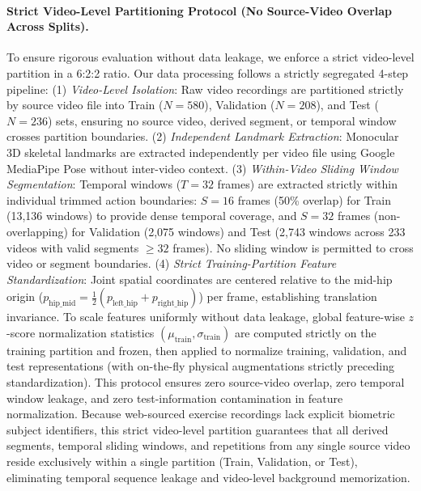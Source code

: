 \documentclass[preprint,12pt]{elsarticle}
\begin{document}
\paragraph{Strict Video-Level Partitioning Protocol (No Source-Video Overlap Across Splits).} To ensure rigorous evaluation without data leakage, we enforce a strict video-level partition in a 6:2:2 ratio. Our data processing follows a strictly segregated 4-step pipeline: (1) \textit{Video-Level Isolation}: Raw video recordings are partitioned strictly by source video file into Train ($N=580$), Validation ($N=208$), and Test ($N=236$) sets, ensuring no source video, derived segment, or temporal window crosses partition boundaries. (2) \textit{Independent Landmark Extraction}: Monocular 3D skeletal landmarks are extracted independently per video file using Google MediaPipe Pose without inter-video context. (3) \textit{Within-Video Sliding Window Segmentation}: Temporal windows ($T = 32$ frames) are extracted strictly within individual trimmed action boundaries: $S = 16$ frames (50\% overlap) for Train (13,136 windows) to provide dense temporal coverage, and $S = 32$ frames (non-overlapping) for Validation (2,075 windows) and Test (2,743 windows across 233 videos with valid segments $\ge 32$ frames). No sliding window is permitted to cross video or segment boundaries. (4) \textit{Strict Training-Partition Feature Standardization}: Joint spatial coordinates are centered relative to the mid-hip origin ($p_{\text{hip\_mid}} = \frac{1}{2}(p_{\text{left\_hip}} + p_{\text{right\_hip}})$) per frame, establishing translation invariance. To scale features uniformly without data leakage, global feature-wise $z$-score normalization statistics $(\mu_{\text{train}}, \sigma_{\text{train}})$ are computed strictly on the training partition and frozen, then applied to normalize training, validation, and test representations (with on-the-fly physical augmentations strictly preceding standardization). This protocol ensures zero source-video overlap, zero temporal window leakage, and zero test-information contamination in feature normalization. Because web-sourced exercise recordings lack explicit biometric subject identifiers, this strict video-level partition guarantees that all derived segments, temporal sliding windows, and repetitions from any single source video reside exclusively within a single partition (Train, Validation, or Test), eliminating temporal sequence leakage and video-level background memorization.
\end{document}

